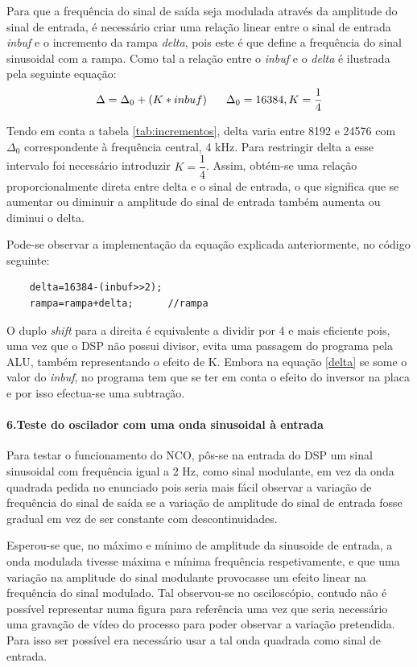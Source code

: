 \documentclass[11pt]{article}
\numberwithin{equation}{section}
\begin{document}
Para que a frequência do sinal de saída seja modulada através da amplitude do sinal de entrada, é necessário criar uma relação linear entre o sinal de entrada \textit{inbuf} e o incremento da rampa \textit{delta}, pois este é que define a frequência do sinal sinusoidal com a rampa. Como tal a relação entre o \textit{inbuf} e o \textit{delta} é ilustrada pela seguinte equação:
\begin{equation}
	\Delta=\Delta_0+(K*inbuf)	\hspace{6 mm}\Delta_0=16384, K=\frac{1}{4}
	\label{delta}
\end{equation}

Tendo em conta a tabela \ref{tab:incrementos}, delta varia entre 8192 e 24576 com $\Delta_0$ correspondente à frequência central, 4 kHz. Para restringir delta a esse intervalo foi necessário introduzir $K=\dfrac{1}{4}$. Assim, obtém-se uma relação proporcionalmente direta entre delta e o sinal de entrada, o que significa que se aumentar ou diminuir a amplitude do sinal de entrada também aumenta ou diminui o delta.

Pode-se observar a implementação da equação explicada anteriormente, no código seguinte:
\begin{lstlisting}
	delta=16384-(inbuf>>2); 
	rampa=rampa+delta;		//rampa
\end{lstlisting}

O duplo \textit{shift} para a direita é equivalente a dividir por 4 e mais eficiente pois, uma vez que o DSP não possui divisor, evita uma passagem do programa pela ALU, também representando o efeito de K.
Embora na equação \ref{delta} se some o valor do \textit{inbuf}, no programa tem que se ter em conta o efeito do inversor na placa e por isso efectua-se uma subtração.
\paragraph{6.Teste do oscilador com uma onda sinusoidal à entrada} \label{para:P1-6} \hspace{0pt}

Para testar o funcionamento do NCO, pôs-se na entrada do DSP um sinal sinusoidal com frequência igual a 2 Hz, como sinal modulante, em vez da onda quadrada pedida no enunciado pois seria mais fácil observar a variação de frequência do sinal de saída se a variação de amplitude do sinal de entrada fosse gradual em vez de ser constante com descontinuidades. 
\vspace{1 mm}

Esperou-se que, no máximo e mínimo de amplitude da sinusoide de entrada, a onda modulada tivesse máxima e mínima frequência respetivamente, e que uma variação na amplitude do sinal modulante provocasse um efeito linear na frequência do sinal modulado. Tal observou-se no osciloscópio, contudo não é possível representar numa figura para referência uma vez que seria necessário uma gravação de vídeo do processo para poder observar a variação pretendida. Para isso ser possível era necessário usar a tal onda quadrada como sinal de entrada.
\end{document}
